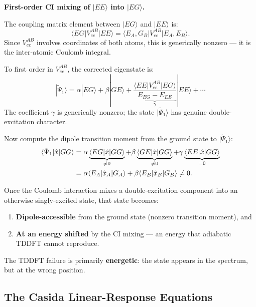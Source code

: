 \documentclass[12pt,letterpaper]{article}
\newcommand{\mel}[3]{\langle #1 \vert #2 \vert #3 \rangle}
\theoremstyle{definition}
\begin{document}
\begin{derivbox}
\textbf{First-order CI mixing of $|EE\rangle$ into $|EG\rangle$.}

The coupling matrix element between $|EG\rangle$ and $|EE\rangle$
is:
\[
  \mel{EG}{V_{ee}^{AB}}{EE}
  = \mel{E_A,G_B}{V_{ee}^{AB}}{E_A,E_B}.
\]
Since $V_{ee}^{AB}$ involves coordinates of both atoms, this is
generically nonzero --- it is the inter-atomic Coulomb integral.

To first order in $V_{ee}^{AB}$, the corrected eigenstate is:
\begin{equation}
  |\tilde{\Psi}_1\rangle
  = \alpha|EG\rangle + \beta|GE\rangle
  + \underbrace{\frac{\mel{EE}{V_{ee}^{AB}}{EG}}{E_{EG}-E_{EE}}}_{\gamma}|EE\rangle
  + \cdots
  \label{eq:mixed_state}
\end{equation}
The coefficient $\gamma$ is generically nonzero; the state
$|\tilde{\Psi}_1\rangle$ has genuine double-excitation character.
\end{derivbox}

Now compute the dipole transition moment from the ground state to
$|\tilde{\Psi}_1\rangle$:
\begin{align}
  \mel{\tilde{\Psi}_1}{\hat{x}}{GG}
  &= \alpha\underbrace{\mel{EG}{\hat{x}}{GG}}_{\neq 0}
   + \beta\underbrace{\mel{GE}{\hat{x}}{GG}}_{\neq 0}
   + \gamma\underbrace{\mel{EE}{\hat{x}}{GG}}_{=0}
  \notag\\
  &= \alpha\mel{E_A}{\hat{x}_A}{G_A}
   + \beta\mel{E_B}{\hat{x}_B}{G_B}
  \neq 0.
  \label{eq:mixed_dipole}
\end{align}

\begin{keyresult}
Once the Coulomb interaction mixes a double-excitation component
into an otherwise singly-excited state, that state becomes:
\begin{enumerate}[noitemsep]
  \item \textbf{Dipole-accessible} from the ground state (nonzero
    transition moment), and
  \item \textbf{At an energy shifted} by the CI mixing --- an energy
    that adiabatic TDDFT cannot reproduce.
\end{enumerate}
The TDDFT failure is primarily \textbf{energetic}: the state appears
in the spectrum, but at the wrong position.
\end{keyresult}

\subsection{The Casida Linear-Response Equations}
\label{sec:casida}
\end{document}
